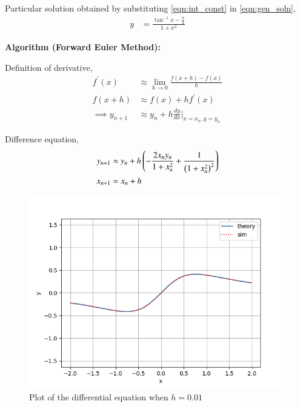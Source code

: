 \documentclass[journal]{IEEEtran}
\begin{document}
Particular solution obtained by substituting \eqref{eqn:int_const} in \eqref{eqn:gen_soln},
\begin{align}
    y &= \frac{\tan^{-1}x - \frac{\pi}{4}}{1+x^2}
\end{align}

\medskip

\textbf{Algorithm (Forward Euler Method):}

Definition of derivative,
\begin{align}
    f^\prime(x) &\approx \lim_{h\to0}\frac{f(x+h)-f(x)}{h} \\
    f(x+h) &\approx f(x)+hf^\prime(x) \\
    \implies y_{n+1} &\approx y_{n} + h\frac{dy}{dx}\Big|_{x=x_{n}, y=y_{n}}
\end{align}

Difference equation,
\begin{align}
    y_{n+1} &\approx y_{n} + h\left(-\frac{2x_{n}y_{n}}{1+x_{n}^2} + \frac{1}{\left(1+x_{n}^2\right)^2}\right) \\
    x_{n+1} &= x_{n}+h
\end{align}

\begin{figure}[h]
    \centering
    \includegraphics[width=\columnwidth]{figs/plot.png}
    \caption{Plot of the differential equation when $h=0.01$}
    \label{fig:Plot1}
    \end{figure}
\end{document}
